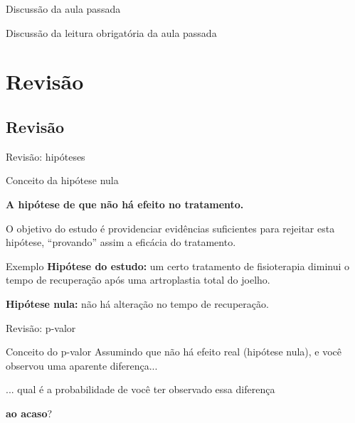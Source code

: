 \documentclass{beamer}
\begin{document}

\begin{frame}{\scriptsize Discussão da aula passada}
  \begin{block}{}
    Discussão da leitura obrigatória da aula passada
  \end{block}
\end{frame}

\section{Revisão}

\subsection{Revisão}

\begin{frame}{\scriptsize Revisão: hipóteses}
  \begin{block}{Conceito da hipótese nula}
    \begin{center}
      {\bf A hipótese de que não há efeito no tratamento.}
    \end{center}

    \bigskip
    \footnotesize
    O objetivo do estudo é providenciar evidências suficientes para rejeitar esta hipótese, ``provando'' assim a eficácia do tratamento.
  \end{block}
  \bigskip
  \begin{exampleblock}{Exemplo}
    \scriptsize
    {\bf Hipótese do estudo:} um certo tratamento de fisioterapia diminui o tempo de recuperação após uma artroplastia total do joelho.

    \bigskip
    {\bf Hipótese nula:} não há alteração no tempo de recuperação.
  \end{exampleblock}
\end{frame}

\begin{frame}{\scriptsize Revisão: p-valor}
  \begin{block}{Conceito do p-valor}
    \footnotesize
    Assumindo que não há efeito real (hipótese nula), e você observou uma aparente diferença...

    \bigskip
    \begin{block}{}
    \footnotesize
    ... qual é a probabilidade de você ter observado essa diferença

    {\bf ao acaso}?
    \end{block}
  \end{block}
\end{frame}
\end{document}
